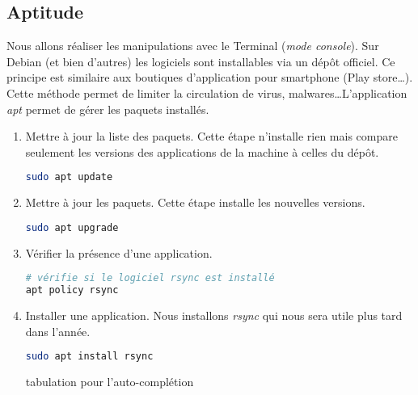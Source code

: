 \documentclass[a4paper,11pt]{article}
\begin{document}
\subsection{Aptitude}
Nous allons réaliser les manipulations avec le Terminal (\emph{mode console}). Sur Debian (et bien d'autres) les logiciels sont installables via un dépôt officiel. Ce principe est similaire aux boutiques d'application pour smartphone (Play store\dots). Cette méthode permet de limiter la circulation de virus, malwares\dots L'application \emph{apt} permet de gérer les paquets installés.
\begin{activite}
\begin{enumerate}
    \item Mettre à jour la liste des paquets. Cette étape n'installe rien mais compare seulement les versions des applications de la machine à celles du dépôt.
    \begin{lstlisting}[language=bash]
sudo apt update
            \end{lstlisting}
    \item Mettre à jour les paquets. Cette étape installe les nouvelles versions.
    \begin{lstlisting}[language=bash]
sudo apt upgrade
            \end{lstlisting}
    \item Vérifier la présence d'une application.
    \begin{lstlisting}[language=bash]
# vérifie si le logiciel rsync est installé
apt policy rsync
            \end{lstlisting}
    \item Installer une application. Nous installons \emph{rsync} qui nous sera utile plus tard dans l'année.
    \begin{lstlisting}[language=bash]
sudo apt install rsync
            \end{lstlisting}
            \begin{commentprof}
            tabulation pour l'auto-complétion
            \end{commentprof}
\end{enumerate}
\end{activite}
\end{document}
